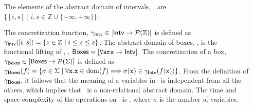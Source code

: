 \documentclass{llncs}
\newcommand{\comment}[1]{}
\begin{document}
The elements of the abstract domain of intervals, \Intervals, are $\{
[i, s] \mid i,s \in \mathbb{Z} \cup \{-\infty, + \infty\} \}$.  
\comment{
The
order is the interval inclusion, the bottom element is the empty
interval (\ie, an interval where $s < i$), the largest element is the
line $[-\infty, +\infty]$, the join and the meet are respectively the
union and the intersection of intervals.  
}
The concretization function,
$\gamma_{\mathsf{Intv}} \in [\mathsf{Intv} \rightarrow\mathcal{P}{(\mathbb{Z})}]$ is
defined as $\gamma_{\mathsf{Intv}}([i, s]) = \{ z \in \mathbb{Z} \mid i
\leq z \leq s\}$.  The abstract domain of boxes, \Boxes, is the
functional lifting of \Intervals, \ie, $\mathsf{Boxes} =
[\mathtt{Vars} \rightarrow\mathsf{Intv}]$.  The concretization of a box,
$\gamma_{\mathsf{Boxes}} \in [\mathsf{Boxes} \rightarrow\mathcal{P}{(\Sigma)}]$ is defined
as $\gamma_{\mathsf{Boxes}}(f) = \{ \sigma \in \Sigma \mid \forall
\mathtt{x}. \mathtt{x} \in \mathrm{dom}(f) \Longrightarrow
\sigma(\mathtt{x}) \in \gamma_{\mathsf{Intv}}(f(\mathtt{x}))\}$.  From the
definition of $\gamma_{\mathsf{Boxes}}$, it follows that the meaning of a
variables in \Boxes\ is independent from all the others, which implies
that \Boxes\ is a non-relational abstract domain.  The time and space
complexity of the operations on \Boxes\ is , where $n$ is the number
of variables.

\comment{
The abstract domain of difference bounds matrices, \DBM~\cite{Mine01-1}, captures properties in the form of $\code{x} - \code{y} \leq z$, with $ z \in  \mathbb{Z}$.
The abstract domain of octagons, \Octagons~\cite{Mine01-2}, refines \DBM\ by capturing properties in the form of $\pm \code{x} \pm \code{y} \leq z$, with $z \in \mathbb{Z}$.
Octagons elements are represented as a weighted direct graph, and the lattice operations are defined point-wisely.  
The meaning of octagon elements is given by the concretization $\gamma_\Octagons \in \funzione{\Octagons}{\parti{\Sigma}}$ defined as $\gamma_\Octagons(o) = \bigcap_{\code{x} \stackrel{z}{\rightarrow} \code{y} \in o} \{ \sigma \in \Sigma \mid \sigma(\code{x}) - \sigma(\code{y}) \leq z\}$.
From the definition of $\gamma_\Octagons$ it follows that \Octagons\ can capture relations between \emph{two} variables, thus it is a (weakly) relational domain.
\Octagons\ is the most precise known numerical abstract domain which shows a polynomial complexity: it is \Order{n^3} in time  and \Order{n^2} in space.
}
\end{document}
